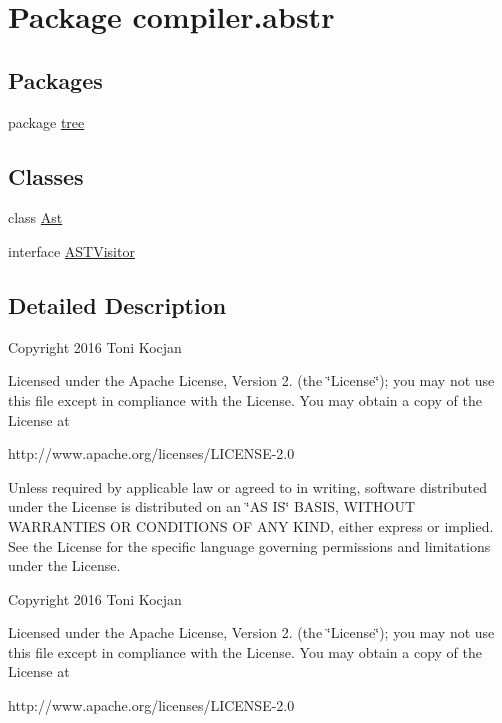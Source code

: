 \hypertarget{namespacecompiler_1_1abstr}{}\section{Package compiler.\+abstr}
\label{namespacecompiler_1_1abstr}
\subsection*{Packages}
\begin{DoxyCompactItemize}
\item 
package \hyperlink{namespacecompiler_1_1abstr_1_1tree}{tree}
\end{DoxyCompactItemize}
\subsection*{Classes}
\begin{DoxyCompactItemize}
\item 
class \hyperlink{classcompiler_1_1abstr_1_1_ast}{Ast}
\item 
interface \hyperlink{interfacecompiler_1_1abstr_1_1_a_s_t_visitor}{A\+S\+T\+Visitor}
\end{DoxyCompactItemize}


\subsection{Detailed Description}
Copyright 2016 Toni Kocjan

Licensed under the Apache License, Version 2. (the \char`\"{}\+License\char`\"{}); you may not use this file except in compliance with the License. You may obtain a copy of the License at \begin{DoxyVerb}http://www.apache.org/licenses/LICENSE-2.0
\end{DoxyVerb}


Unless required by applicable law or agreed to in writing, software distributed under the License is distributed on an \char`\"{}\+A\+S I\+S\char`\"{} B\+A\+S\+IS, W\+I\+T\+H\+O\+UT W\+A\+R\+R\+A\+N\+T\+I\+ES OR C\+O\+N\+D\+I\+T\+I\+O\+NS OF A\+NY K\+I\+ND, either express or implied. See the License for the specific language governing permissions and limitations under the License.

Copyright 2016 Toni Kocjan

Licensed under the Apache License, Version 2. (the \char`\"{}\+License\char`\"{}); you may not use this file except in compliance with the License. You may obtain a copy of the License at \begin{DoxyVerb}http://www.apache.org/licenses/LICENSE-2.0
\end{DoxyVerb}


